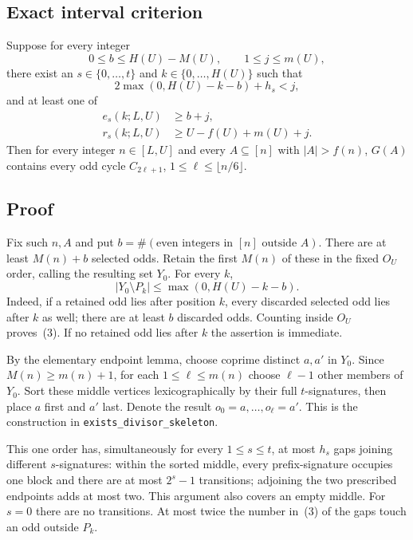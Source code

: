 \subsection*{Exact interval criterion}
Suppose for every integer
\[
0\le b\le H(U)-M(U),\qquad 1\le j\le m(U),
\]
there exist an $s\in\{0,\ldots,t\}$ and $k\in\{0,\ldots,H(U)\}$ such that
\begin{equation}
2\max(0,H(U)-k-b)+h_s<j, \tag{1}
\end{equation}
and at least one of
\begin{align}
e_s(k;L,U)&\ge b+j, \tag{2E}\\
r_s(k;L,U)&\ge U-f(U)+m(U)+j. \tag{2R}
\end{align}
Then for every integer $n\in[L,U]$ and every $A\subseteq[n]$ with $|A|>f(n)$, $G(A)$ contains every odd cycle $C_{2\ell+1}$, $1\le\ell\le\lfloor n/6\rfloor$.

\subsection*{Proof}
Fix such $n,A$ and put $b=\#(\text{even integers in }[n]\text{ outside }A)$. There are at least $M(n)+b$ selected odds. Retain the first $M(n)$ of these in the fixed $O_U$ order, calling the resulting set $Y_0$. For every $k$,
\begin{equation}
|Y_0\setminus P_k|\le\max(0,H(U)-k-b). \tag{3}
\end{equation}
Indeed, if a retained odd lies after position $k$, every discarded selected odd lies after $k$ as well; there are at least $b$ discarded odds. Counting inside $O_U$ proves~(3). If no retained odd lies after $k$ the assertion is immediate.

By the elementary endpoint lemma, choose coprime distinct $a,a'$ in $Y_0$. Since $M(n)\ge m(n)+1$, for each $1\le\ell\le m(n)$ choose $\ell-1$ other members of $Y_0$. Sort these middle vertices lexicographically by their full $t$-signatures, then place $a$ first and $a'$ last. Denote the result $o_0=a,\ldots,o_\ell=a'$. This is the construction in \texttt{exists\_divisor\_skeleton}.

This one order has, simultaneously for every $1\le s\le t$, at most $h_s$ gaps joining different $s$-signatures: within the sorted middle, every prefix-signature occupies one block and there are at most $2^s-1$ transitions; adjoining the two prescribed endpoints adds at most two. This argument also covers an empty middle. For $s=0$ there are no transitions. At most twice the number in~(3) of the gaps touch an odd outside $P_k$.

